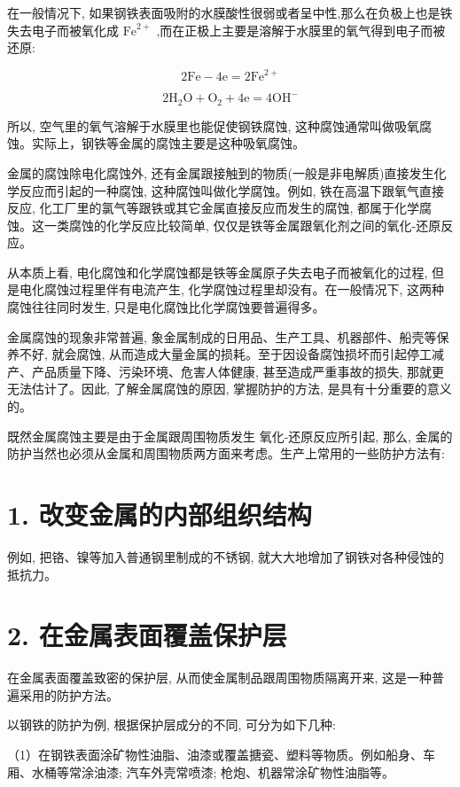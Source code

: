 \documentclass[10pt]{article}
\begin{document}
在一般情况下, 如果钢铁表面吸附的水膜酸性很弱或者呈中性,那么在负极上也是铁失去电子而被氧化成 \({\mathrm{{Fe}}}^{2 + }\) ,而在正极上主要是溶解于水膜里的氧气得到电子而被还原:

\[
2\mathrm{{Fe}} - 4\mathrm{e} = 2{\mathrm{{Fe}}}^{2 + }
\]

\[
2{\mathrm{H}}_{2}\mathrm{O} + {\mathrm{O}}_{2} + 4\mathrm{e} = 4{\mathrm{{OH}}}^{ - }
\]

所以, 空气里的氧气溶解于水膜里也能促使钢铁腐蚀, 这种腐蚀通常叫做吸氧腐蚀。实际上，钢铁等金属的腐蚀主要是这种吸氧腐蚀。

金属的腐蚀除电化腐蚀外, 还有金属跟接触到的物质(一般是非电解质)直接发生化学反应而引起的一种腐蚀, 这种腐蚀叫做化学腐蚀。例如, 铁在高温下跟氧气直接反应, 化工厂里的氯气等跟铁或其它金属直接反应而发生的腐蚀, 都属于化学腐蚀。这一类腐蚀的化学反应比较简单, 仅仅是铁等金属跟氧化剂之间的氧化-还原反应。

从本质上看, 电化腐蚀和化学腐蚀都是铁等金属原子失去电子而被氧化的过程, 但是电化腐蚀过程里伴有电流产生, 化学腐蚀过程里却没有。在一般情况下, 这两种腐蚀往往同时发生, 只是电化腐蚀比化学腐蚀要普遍得多。

金属腐蚀的现象非常普遍, 象金属制成的日用品、生产工具、机器部件、船壳等保养不好, 就会腐蚀, 从而造成大量金属的损耗。至于因设备腐蚀损坏而引起停工减产、产品质量下降、污染环境、危害人体健康, 甚至造成严重事故的损失, 那就更无法估计了。因此, 了解金属腐蚀的原因, 掌握防护的方法, 是具有十分重要的意义的。

既然金属腐蚀主要是由于金属跟周围物质发生 氧化-还原反应所引起, 那么, 金属的防护当然也必须从金属和周围物质两方面来考虑。生产上常用的一些防护方法有:

\section*{1. 改变金属的内部组织结构}

例如, 把铬、镍等加入普通钢里制成的不锈钢, 就大大地增加了钢铁对各种侵蚀的抵抗力。

\section*{2. 在金属表面覆盖保护层}

在金属表面覆盖致密的保护层, 从而使金属制品跟周围物质隔离开来, 这是一种普遍采用的防护方法。

以钢铁的防护为例, 根据保护层成分的不同, 可分为如下几种:

（1）在钢铁表面涂矿物性油脂、油漆或覆盖搪瓷、塑料等物质。例如船身、车厢、水桶等常涂油漆; 汽车外壳常喷漆; 枪炮、机器常涂矿物性油脂等。
\end{document}
